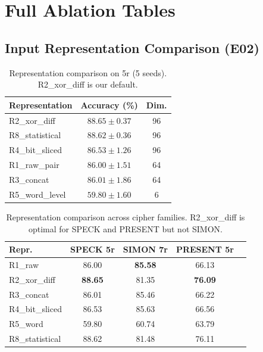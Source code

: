 \section{Full Ablation Tables}
\label{sec:app-ablations}

\FloatBarrier
\subsection{Input Representation Comparison (E02)}

\begin{table}[htbp]
\centering
\caption{Representation comparison on \speck 5r (5 seeds).
         R2\_xor\_diff is our default.}
\label{tab:repr-speck}
\begin{tabular}{@{}lcc@{}}
\toprule
\textbf{Representation} & \textbf{Accuracy (\%)} & \textbf{Dim.} \\
\midrule
R2\_xor\_diff  & $88.65 \pm 0.37$ & 96 \\
R8\_statistical & $88.62 \pm 0.36$ & 96 \\
R4\_bit\_sliced & $86.53 \pm 1.26$ & 96 \\
R1\_raw\_pair   & $86.00 \pm 1.51$ & 64 \\
R3\_concat      & $86.01 \pm 1.86$ & 64 \\
R5\_word\_level & $59.80 \pm 1.60$ & 6 \\
\bottomrule
\end{tabular}
\end{table}

\begin{table}[htbp]
\centering
\caption{Representation comparison across cipher families.
         R2\_xor\_diff is optimal for SPECK and PRESENT but not SIMON.}
\label{tab:repr-cross}
\begin{tabular}{@{}lcccc@{}}
\toprule
\textbf{Repr.} & \textbf{SPECK 5r} & \textbf{SIMON 7r} & \textbf{PRESENT 5r} \\
\midrule
R1\_raw        & 86.00 & \textbf{85.58} & 66.13 \\
R2\_xor\_diff  & \textbf{88.65} & 81.35 & \textbf{76.09} \\
R3\_concat     & 86.01 & 85.46 & 66.22 \\
R4\_bit\_sliced & 86.53 & 85.63 & 66.56 \\
R5\_word       & 59.80 & 60.74 & 63.79 \\
R8\_statistical & 88.62 & 81.48 & 76.11 \\
\bottomrule
\end{tabular}
\end{table}

